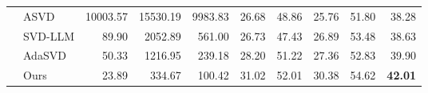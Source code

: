 \begin{table}[h]
\begin{tabular}{llrrrrrrrr}
      & ASVD      & 10003.57 & 15530.19 & 9983.83  & 26.68 & 48.86 & 25.76 & 51.80 & 38.28 \\
      & SVD-LLM   & 89.90    & 2052.89  & 561.00   & 26.73 & 47.43 & 26.89 & 53.48 & 38.63 \\
      & AdaSVD    & 50.33    & 1216.95  & 239.18   & 28.20 & 51.22 & 27.36 & 52.83 & 39.90 \\
      \rowcolor{gray!12}
      & Ours      & 23.89    & 334.67   & 100.42   & 31.02 & 52.01 & 30.38 & 54.62 & \textbf{42.01} \\
    \bottomrule
  \end{tabular}
  \label{tab:27b}
\end{table}
